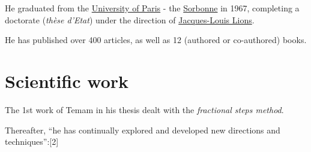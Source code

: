 \documentclass{book}
\numberwithin{equation}{section}
\begin{document}
He graduated from the \href{https://en.wikipedia.org/wiki/University_of_Paris}{University of Paris} - the \href{https://en.wikipedia.org/wiki/Sorbonne}{Sorbonne} in 1967, completing a doctorate (\textit{thèse d'Etat}) under the direction of \href{https://en.wikipedia.org/wiki/Jacques-Louis_Lions}{Jacques-Louis Lions}.

He has published over 400 articles, as well as 12 (authored or co-authored) books.

\section{Scientific work}
The 1st work of Temam in his thesis dealt with the \textit{fractional steps method}.

Thereafter, ``he has continually explored and developed new directions and techniques'':[2]
\end{document}
